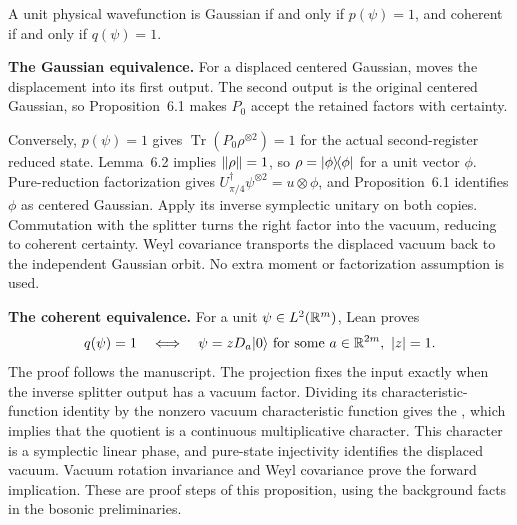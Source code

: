 \begin{proposition}\label{prp:general-certainty}
  \par
  \leanok
  A unit physical wavefunction is Gaussian if and only if $p(\psi)=1$,
  and coherent if and only if $q(\psi)=1$.

  \textbf{The Gaussian equivalence.} For a displaced centered Gaussian,
  moves the displacement into its first output. The second output is the
  original centered Gaussian, so Proposition~6.1 makes $P_0$ accept the
  retained factors with certainty.

  Conversely, $p(\psi)=1$ gives $\operatorname{Tr}(P_0\rho^{\otimes2})=1$
  for the actual second-register reduced state. Lemma~6.2 implies
  $\lVert \rho \rVert=1$, so $\rho=\lvert \phi \rangle\!\langle \phi \rvert$ for a unit vector $\phi$.
  Pure-reduction factorization gives $U_{\pi/4}^\dagger\psi^{\otimes2}=u\otimes\phi$,
  and Proposition~6.1 identifies $\phi$ as centered Gaussian.
  Apply its inverse symplectic unitary on both copies. Commutation with the
  splitter turns the right factor into the vacuum, reducing to coherent
  certainty. Weyl covariance transports the displaced vacuum back to the
  independent Gaussian orbit. No extra moment or factorization assumption is used.

  \textbf{The coherent equivalence.}
  For a unit $\psi\in L^2(\mathbb{R}^m)$, Lean proves
  \[
    q(\psi)=1\quad\Longleftrightarrow\quad
    \psi=zD_a\lvert 0 \rangle\text{ for some }a\in\mathbb{R}^{2m},\ |z|=1.
  \]
  The proof follows the manuscript. The projection fixes the input exactly
  when the inverse splitter output has a vacuum factor. Dividing its
  characteristic-function identity by the nonzero vacuum characteristic
  function gives the ,
  which implies that the quotient is a continuous multiplicative character.
  This character is a symplectic linear phase, and pure-state injectivity
  identifies the displaced vacuum. Vacuum rotation invariance and Weyl
  covariance prove the forward implication. These are proof steps of this
  proposition, using the background facts in the bosonic preliminaries.

\end{proposition}

